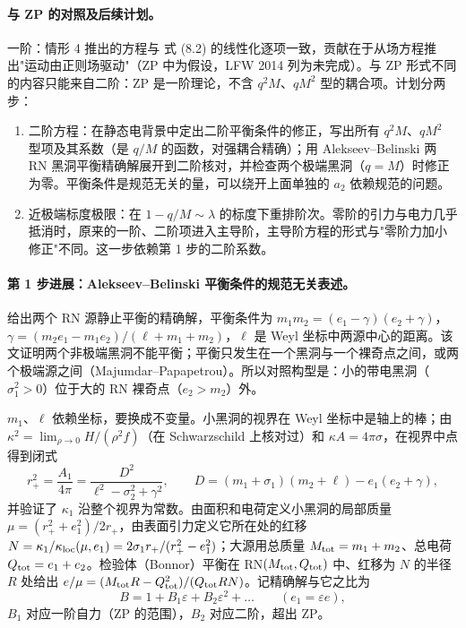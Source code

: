\documentclass[11pt,a4paper]{ctexart}
\numberwithin{equation}{section}
\begin{document}
\paragraph{与 ZP 的对照及后续计划。}一阶：情形 4 推出的方程与 \citet{ZimmermanPoisson2014} 式 (8.2) 的线性化逐项一致，贡献在于从场方程推出"运动由正则场驱动"（ZP 中为假设，LFW 2014 列为未完成）。与 ZP 形式不同的内容只能来自二阶：ZP 是一阶理论，不含 $q^2M$、$qM^2$ 型的耦合项。计划分两步：
\begin{enumerate}
\item 二阶方程：在静态电背景中定出二阶平衡条件的修正，写出所有 $q^2M$、$qM^2$ 型项及其系数（是 $q/M$ 的函数，对强耦合精确）；用 Alekseev--Belinski 两 RN 黑洞平衡精确解展开到二阶核对，并检查两个极端黑洞（$q=M$）时修正为零。平衡条件是规范无关的量，可以绕开上面单独的 $a_2$ 依赖规范的问题。
\item 近极端标度极限：在 $1-q/M\sim\lambda$ 的标度下重排阶次。零阶的引力与电力几乎抵消时，原来的一阶、二阶项进入主导阶，主导阶方程的形式与"零阶力加小修正"不同。这一步依赖第 1 步的二阶系数。
\end{enumerate}

\paragraph{第 1 步进展：Alekseev--Belinski 平衡条件的规范无关表述。}\citet{AlekseevBelinski2007} 给出两个 RN 源静止平衡的精确解，平衡条件为 $m_1m_2=(e_1-\gamma)(e_2+\gamma)$，$\gamma=(m_2e_1-m_1e_2)/(\ell+m_1+m_2)$，$\ell$ 是 Weyl 坐标中两源中心的距离。该文证明两个非极端黑洞不能平衡；平衡只发生在一个黑洞与一个裸奇点之间，或两个极端源之间（Majumdar--Papapetrou）。所以对照构型是：小的带电黑洞（$\sigma_1^2>0$）位于大的 RN 裸奇点（$e_2>m_2$）外。

$m_1$、$\ell$ 依赖坐标，要换成不变量。小黑洞的视界在 Weyl 坐标中是轴上的棒；由 $\kappa^2=\lim_{\rho\to0}H/(\rho^2f)$（在 Schwarzschild 上核对过）和 $\kappa A=4\pi\sigma$，在视界中点得到闭式
\begin{equation*}
r_+^2=\frac{A_1}{4\pi}=\frac{D^2}{\ell^2-\sigma_2^2+\gamma^2},\qquad D=(m_1+\sigma_1)(m_2+\ell)-e_1(e_2+\gamma),
\end{equation*}
并验证了 $\kappa_1$ 沿整个视界为常数。由面积和电荷定义小黑洞的局部质量 $\mu=(r_+^2+e_1^2)/2r_+$，由表面引力定义它所在处的红移 $N=\kappa_1/\kappa_{\rm loc}(\mu,e_1)=2\sigma_1r_+/(r_+^2-e_1^2)$；大源用总质量 $M_{\rm tot}=m_1+m_2$、总电荷 $Q_{\rm tot}=e_1+e_2$。检验体（Bonnor）平衡在 RN$(M_{\rm tot},Q_{\rm tot})$ 中、红移为 $N$ 的半径 $R$ 处给出 $e/\mu=(M_{\rm tot}R-Q_{\rm tot}^2)/(Q_{\rm tot}RN)$。记精确解与它之比为
\begin{equation*}
B=1+B_1\varepsilon+B_2\varepsilon^2+\dots\qquad(e_1=\varepsilon e),
\end{equation*}
$B_1$ 对应一阶自力（ZP 的范围），$B_2$ 对应二阶，超出 ZP。
\end{document}
